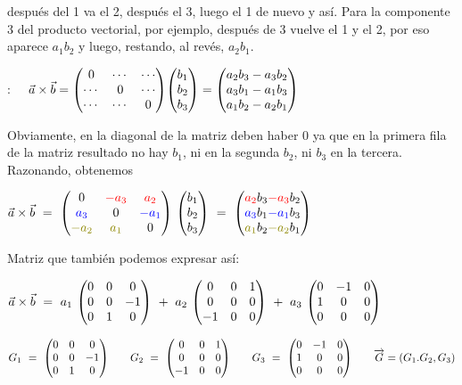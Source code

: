 después del 1 va el 2, después el 3, luego el 1 de nuevo y así. Para la componente 3 del producto vectorial, por ejemplo, después de 3 vuelve el 1 y el 2, por eso aparece $a_1b_2$ y luego, restando, al revés, $a_2b_1$.


: $\quad \vec a \times \vec b = \mqty(0& \cdots & \cdots \\ \cdots & 0 & \cdots \\ \cdots & \cdots& 0) \mqty(b_1\\b_2\\b_3) = \mqty(a_2b_3-a_3b_2\\a_3b_1-a_1b_3\\a_1b_2-a_2b_1)$

Obviamente, en la diagonal de la matriz deben haber $0$ ya que en la primera fila de la matriz resultado no hay $b_1$, ni en la segunda $b_2$, ni $b_3$ en la tercera. Razonando, obtenemos

$\vec a \times \vec b \ = \ \mqty(0& \textcolor{red}{-a_3} & \textcolor{red}{a_2} \\ \textcolor{blue}{a_3} & 0 & \textcolor{blue}{-a_1} \\ \textcolor{olive}{-a_2} & \textcolor{olive}{a_1} & 0) \ \mqty(b_1\\b_2\\b_3) \ = \  \mqty(\textcolor{red}{a_2}b_3\textcolor{red}{-a_3}b_2\\ \textcolor{blue}{a_3}b_1\textcolor{blue}{-a_1}b_3\\ \textcolor{olive}{a_1}b_2\textcolor{olive}{-a_2}b_1)$

Matriz que también podemos expresar así:

$\vec a \times \vec b \ = \ a_1 \ \mqty(0&0&0\\0&0&-1\\0&1&0) 
\ + \ a_2 \ \mqty(0&0&1\\0&0&0\\-1&0&0) \ + \ a_3 \ \mqty(0&-1&0\\1&0&0\\0&0&0)$

\begin{equation}
G_1 \ = \ \mqty(0&0&0\\0&0&-1\\0&1&0) \qquad
G_2 \ = \ \mqty(0&0&1\\0&0&0\\-1&0&0) \qquad
G_3 \ = \ \mqty(0&-1&0\\1&0&0\\0&0&0) \qquad
\overrightarrow G=(G_1.G_2,G_3)	
\end{equation}

